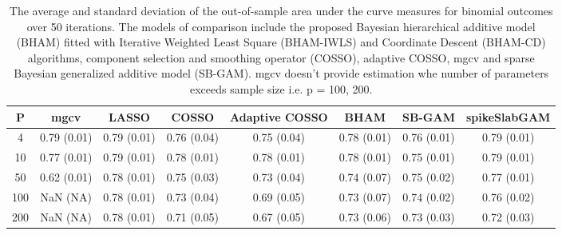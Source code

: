 \begin{table}[ht]
\centering
\begin{tabular}{cccccccc}
  \hline
P & mgcv & LASSO & COSSO & Adaptive COSSO & BHAM & SB-GAM & spikeSlabGAM \\ 
  \hline
  4 & 0.79 (0.01) & 0.79 (0.01) & 0.76 (0.04) & 0.75 (0.04) & 0.78 (0.01) & 0.76 (0.01) & 0.79 (0.01) \\ 
   10 & 0.77 (0.01) & 0.79 (0.01) & 0.78 (0.01) & 0.78 (0.01) & 0.78 (0.01) & 0.75 (0.01) & 0.79 (0.01) \\ 
   50 & 0.62 (0.01) & 0.78 (0.01) & 0.75 (0.03) & 0.73 (0.04) & 0.74 (0.07) & 0.75 (0.02) & 0.77 (0.01) \\ 
  100 & NaN (NA) & 0.78 (0.01) & 0.73 (0.04) & 0.69 (0.05) & 0.73 (0.07) & 0.74 (0.02) & 0.76 (0.02) \\ 
  200 & NaN (NA) & 0.78 (0.01) & 0.71 (0.05) & 0.67 (0.05) & 0.73 (0.06) & 0.73 (0.03) & 0.72 (0.03) \\ 
   \hline
\end{tabular}
\caption{The average and standard deviation of the out-of-sample area under the curve measures
    for binomial outcomes over 50 iterations. The models of comparison include the proposed Bayesian
    hierarchical additive model (BHAM) fitted with Iterative Weighted Least Square (BHAM-IWLS) and
    Coordinate Descent (BHAM-CD) algorithms, component selection and smoothing operator (COSSO),
    adaptive COSSO, mgcv and sparse Bayesian generalized additive model (SB-GAM). mgcv doesn't provide
    estimation whe number of parameters exceeds sample size i.e. p = 100, 200.} 
\label{tab:lnr_bin_auc}
\end{table}
